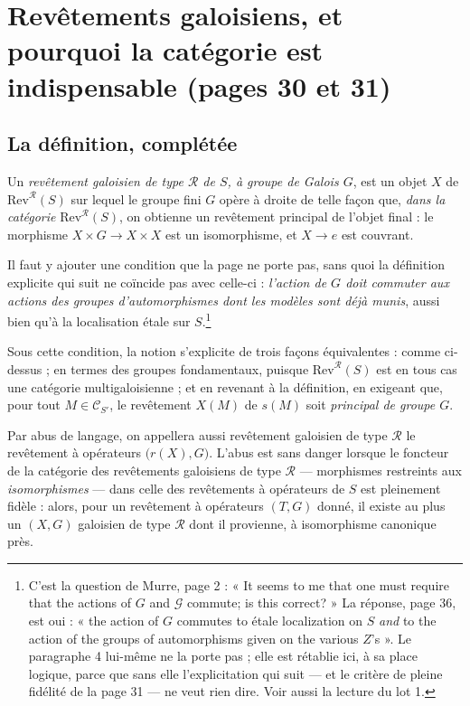 \documentclass[11pt,a4paper]{article}
\begin{document}
\section*{Revêtements galoisiens, et pourquoi la catégorie est indispensable (pages 30 et 31)}

\subsection*{La définition, complétée}

Un \emph{revêtement galoisien de type $\mathcal{R}$ de $S$, à groupe de Galois
$G$}, est un objet $X$ de $\mathrm{Rev}^{\mathcal{R}}(S)$ sur lequel le groupe
fini $G$ opère à droite de telle façon que, \emph{dans la catégorie}
$\mathrm{Rev}^{\mathcal{R}}(S)$, on obtienne un revêtement principal de l'objet
final : le morphisme $X \times G \to X \times X$ est un isomorphisme, et
$X \to e$ est couvrant.

Il faut y ajouter une condition que la page ne porte pas, sans quoi la
définition explicite qui suit ne coïncide pas avec celle-ci : \emph{l'action de
$G$ doit commuter aux actions des groupes d'automorphismes dont les modèles
sont déjà munis}, aussi bien qu'à la localisation étale sur $S$.\footnote{C'est
la question de Murre, page 2 : « It seems to me that one must require that the
actions of $G$ and $\mathcal{G}$ commute; is this correct? » La réponse, page
36, est oui : « the action of $G$ commutes to étale localization on $S$
\emph{and} to the action of the groups of automorphisms given on the various
$Z$'s ». Le paragraphe 4 lui-même ne la porte pas ; elle est rétablie ici, à sa
place logique, parce que sans elle l'explicitation qui suit --- et le critère
de pleine fidélité de la page 31 --- ne veut rien dire. Voir aussi la lecture
du lot 1.}

Sous cette condition, la notion s'explicite de trois façons équivalentes :
comme ci-dessus ; en termes des groupes fondamentaux, puisque
$\mathrm{Rev}^{\mathcal{R}}(S)$ est en tous cas une catégorie
multigaloisienne ; et en revenant à la définition, en exigeant que, pour tout
$M \in \mathcal{C}_{S'}$, le revêtement $X(M)$ de $s(M)$ soit \emph{principal
de groupe $G$}.

Par abus de langage, on appellera aussi revêtement galoisien de type
$\mathcal{R}$ le revêtement à opérateurs $\bigl(r(X), G\bigr)$. L'abus est sans
danger lorsque le foncteur de la catégorie des revêtements galoisiens de type
$\mathcal{R}$ --- morphismes restreints aux \emph{isomorphismes} --- dans celle
des revêtements à opérateurs de $S$ est pleinement fidèle : alors, pour un
revêtement à opérateurs $(T,G)$ donné, il existe au plus un $(X,G)$ galoisien
de type $\mathcal{R}$ dont il provienne, à isomorphisme canonique près.
\end{document}
